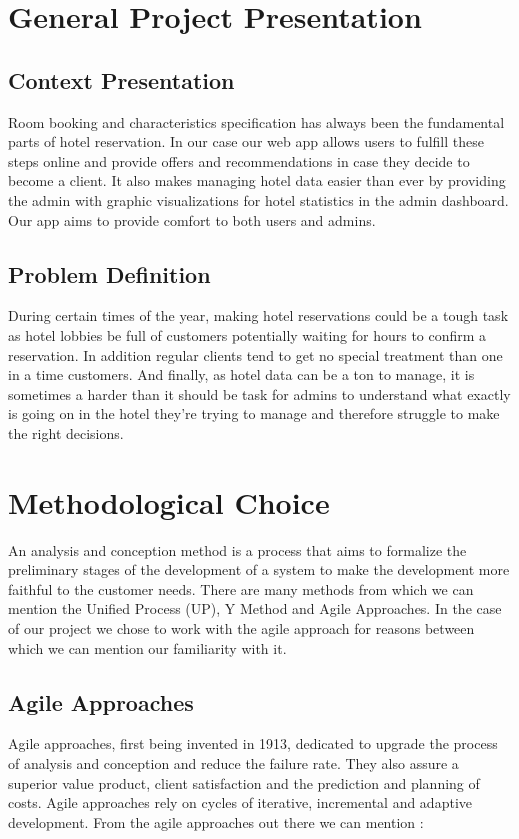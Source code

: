 \documentclass{report}
\begin{document}
\section{General Project Presentation}
 \subsection{Context Presentation}
\textnormal{
Room booking and characteristics specification has always been the fundamental parts of hotel reservation. In our case our web app allows users to fulfill these steps online and provide offers and recommendations in case they decide to become a client. It also makes managing hotel data easier than ever by providing the admin with graphic visualizations for hotel statistics in the admin dashboard. Our app aims to provide comfort to both users and admins.  
}

 \subsection{Problem Definition}
\textnormal{
 During certain times of the year, making hotel reservations could be a tough task as hotel lobbies be full of customers potentially waiting for hours to confirm a reservation. In addition regular clients tend to get no special treatment than one in a time customers. And finally, as hotel data can be a ton to manage, it is sometimes a harder than it should be task for admins to understand what exactly is going on in the hotel they're trying to manage and therefore struggle to make the right decisions.
}

\section{Methodological Choice}
\textnormal{
An analysis and conception method is a process that aims to formalize the preliminary stages of the development of a system to make the development more faithful to the customer needs.
There are many methods from which we can mention the Unified Process (UP), Y Method and Agile Approaches.
In the case of our project we chose to work with the agile approach for reasons between which we can mention our familiarity with it. 
}

 \subsection{Agile Approaches}
\textnormal{
Agile approaches, first being invented in 1913, dedicated to upgrade the process of analysis and conception and reduce the failure rate. They also assure a superior value  product, client satisfaction and the prediction and planning of costs. 
Agile approaches rely on cycles of iterative, incremental and adaptive development. 
From the agile approaches out there we can mention : 
}
\end{document}
